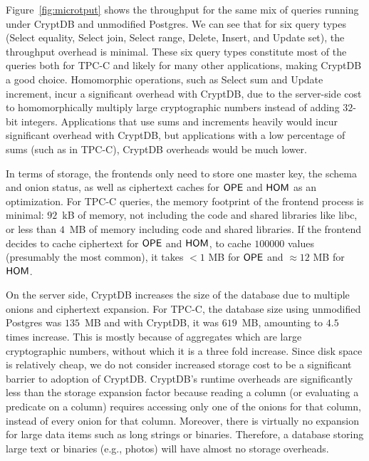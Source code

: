 Figure~\ref{fig:microtput} shows the throughput for the same mix of
queries running under CryptDB and unmodified Postgres.  We can see that
for six query types (Select equality, Select join, Select range,
Delete, Insert, and Update set), the throughput overhead is minimal.
These six query types constitute most of the queries both for TPC-C
and likely for many other applications, making CryptDB a good choice.
Homomorphic operations, such as Select sum and Update increment, incur
a significant overhead with CryptDB, due to the server-side cost to
homomorphically multiply large cryptographic numbers instead of adding $32$-bit
integers.  Applications that use sums and increments heavily would incur
significant overhead with CryptDB, but applications with a low percentage
of sums (such as in TPC-C), CryptDB overheads would be much lower.

In terms of storage, the frontends only need to store one master key,
the schema and onion status, as well as ciphertext caches for $\mathsf{OPE}$
and $\mathsf{HOM}$ as an optimization.  For TPC-C queries, the memory footprint
of the frontend process is minimal: $92$~kB of memory, not including
the code and shared libraries like libc, or less than $4$~MB of memory
including code and shared libraries. If the frontend decides to cache ciphertext
for $\mathsf{OPE}$ and $\mathsf{HOM}$, to cache $100000$ values (presumably the most common), it
takes $ < 1$ MB for $\mathsf{OPE}$ and $\approx 12$ MB for $\mathsf{HOM}$.

On the server side, CryptDB increases the size of the database due to
multiple onions and ciphertext expansion.  For TPC-C, the database size
using unmodified Postgres was $135$~MB and with CryptDB, it was $619$~MB,
amounting to $4.5$ times increase. This is mostly because of aggregates
which are large cryptographic numbers, without which it is a three fold increase.
Since disk space is relatively cheap, we do not consider increased
storage cost to be a significant barrier to adoption of CryptDB\@.
CryptDB's runtime overheads are significantly less than the storage
expansion factor because reading a column (or evaluating a predicate
on a column) requires accessing only one of the onions for that column,
instead of every onion for that column.
Moreover, there is virtually no expansion for large data items such as
long strings or binaries.  Therefore, a database storing large text
or binaries (e.g., photos) will have almost no storage overheads.


